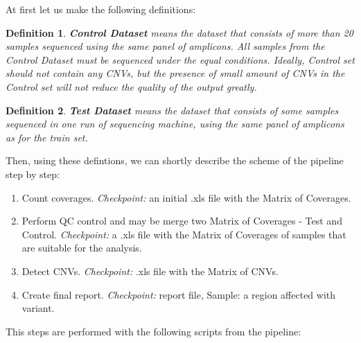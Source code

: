 \documentclass{article}
\newtheorem{mydef}{Definition}
\begin{document}
At first let us make the following definitions:
\begin{mydef}
 {\bf Control Dataset} means the dataset that consists of more than 20 samples sequenced using the same panel of amplicons. All samples from the Control Dataset must be sequenced under the equal conditions. Ideally, Control set should not contain any CNVs, but the presence of small amount of CNVs in the Control set will not reduce the quality of the output greatly.
\end{mydef}

\begin{mydef}
 {\bf Test Dataset} means the dataset that consists of some samples sequenced in one run of sequencing machine, using the same panel of amplicons as for the train set.
\end{mydef}

Then, using these defintions, we can shortly describe the scheme of the pipeline step by step:

\begin{enumerate}
\item Count coverages. {\it Checkpoint:} an initial .xls file with the Matrix of Coverages.

\item Perform QC control and may be merge two Matrix of Coverages - Test and Control. {\it Checkpoint:} a .xls file with the Matrix of Coverages of samples that are suitable for the analysis.

\item Detect CNVs. {\it Checkpoint:} .xls file with the Matrix of CNVs.

\item Create final report. {\it Checkpoint:} report file, Sample: a region affected with variant.

\end{enumerate}



This steps are performed with the following scripts from the pipeline:
\end{document}

